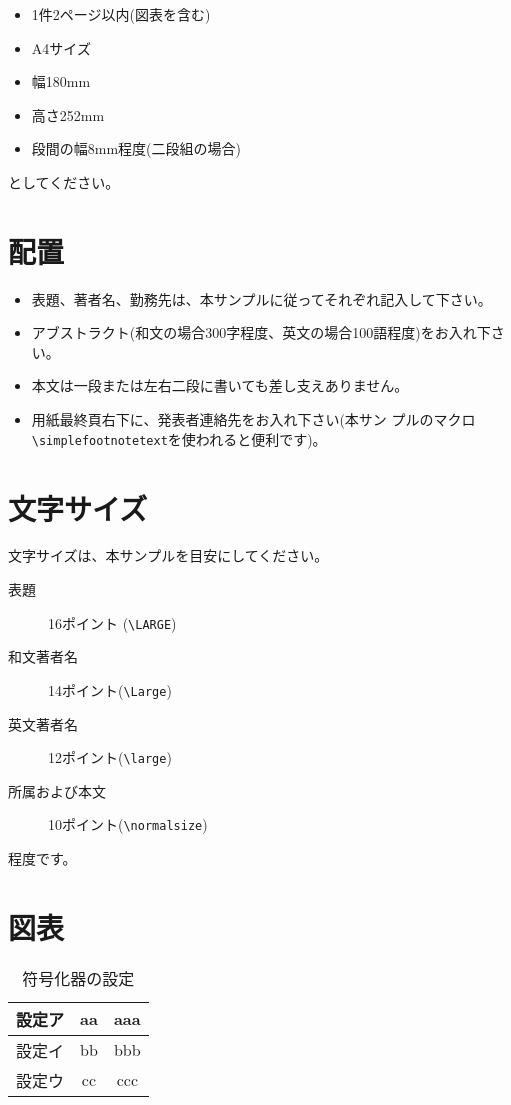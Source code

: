 \documentclass[10pt]{jarticle}
\begin{document}
\begin{itemize}
\item 1件2ページ以内(図表を含む)
\item A4サイズ
\item 幅180mm
\item 高さ252mm
\item 段間の幅8mm程度(二段組の場合)
\end{itemize}
としてください。

\vspace{5cm}

\section{配置}


\begin{itemize}
\item 表題、著者名、勤務先は、本サンプルに従ってそれぞれ記入して下さい。
\item アブストラクト(和文の場合300字程度、英文の場合100語程度)をお入れ下さい。
\item 本文は一段または左右二段に書いても差し支えありません。
\item 用紙最終頁右下に、発表者連絡先をお入れ下さい(本サン
      プルのマクロ\verb|\simplefootnotetext|を使われると便利です)。
\end{itemize}



\section{文字サイズ}
文字サイズは、本サンプルを目安にしてください。
\begin{description}
\item[表題] 16ポイント (\verb|\LARGE|)
\item[和文著者名] 14ポイント(\verb|\Large|)
\item[英文著者名] 12ポイント(\verb|\large|)
\item[所属および本文] 10ポイント(\verb|\normalsize|)
\end{description}
程度です。

\section{図表}

\begin{table}[tb]
\caption{符号化器の設定}
\label{tab:settings}
\centering
\begin{tabular}{c||c|c}\hline
設定ア & aa & aaa\\\hline
設定イ & bb & bbb\\\hline
設定ウ & cc & ccc\\\hline
\end{tabular}
\end{table}
\end{document}

